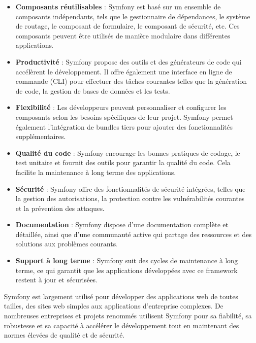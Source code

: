 			\begin{itemize}
				\item \textbf{Composants réutilisables} : Symfony est basé sur un ensemble de composants indépendants, tels que le gestionnaire de dépendances, le système de routage, le composant de formulaire, le composant de sécurité, etc. Ces composants peuvent être utilisés de manière modulaire dans différentes applications.
				\item \textbf{Productivité} : Symfony propose des outils et des générateurs de code qui accélèrent le développement. Il offre également une interface en ligne de commande (CLI) pour effectuer des tâches courantes telles que la génération de code, la gestion de bases de données et les tests.
				\item \textbf{Flexibilité} : Les développeurs peuvent personnaliser et configurer les composants selon les besoins spécifiques de leur projet. Symfony permet également l'intégration de bundles tiers pour ajouter des fonctionnalités supplémentaires.
				\item \textbf{Qualité du code} : Symfony encourage les bonnes pratiques de codage, le test unitaire et fournit des outils pour garantir la qualité du code. Cela facilite la maintenance à long terme des applications.
				\item \textbf{Sécurité} : Symfony offre des fonctionnalités de sécurité intégrées, telles que la gestion des autorisations, la protection contre les vulnérabilités courantes et la prévention des attaques.
				\item \textbf{Documentation} : Symfony dispose d'une documentation complète et détaillée, ainsi que d'une communauté active qui partage des ressources et des solutions aux problèmes courants.
				\item \textbf{Support à long terme} : Symfony suit des cycles de maintenance à long terme, ce qui garantit que les applications développées avec ce framework restent à jour et sécurisées.\\
			\end{itemize}
		
		Symfony est largement utilisé pour développer des applications web de toutes tailles, des sites web simples aux applications d'entreprise complexes. De nombreuses entreprises et projets renommés utilisent Symfony pour sa fiabilité, sa robustesse et sa capacité à accélérer le développement tout en maintenant des normes élevées de qualité et de sécurité.
		
